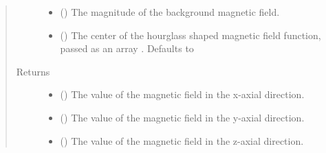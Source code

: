 \documentclass[letterpaper,10pt,english]{sphinxmanual}
\begin{document}
\begin{fulllineitems}
\begin{quote}
\begin{description}
\begin{itemize}
\item {} 
 () \textendash{} The magnitude of the background magnetic field.

\item {} 
 () \textendash{} The center of the hourglass shaped magnetic field function, passed
as an array \sphinxcode{\sphinxupquote{{[}r0,phi0,z0{]}}}. Defaults to \sphinxcode{\sphinxupquote{{[}0,0,0{]}}}

\end{itemize}

\item[{Returns}] \leavevmode
\begin{itemize}
\item {} 
 () \textendash{} The value of the magnetic field in the x-axial direction.

\item {} 
 () \textendash{} The value of the magnetic field in the y-axial direction.

\item {} 
 () \textendash{} The value of the magnetic field in the z-axial direction.

\end{itemize}


\end{description}\end{quote}

\end{fulllineitems}

\end{document}
